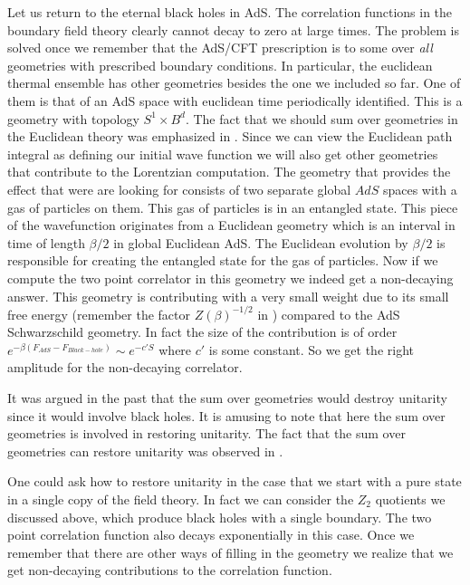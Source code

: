 Let us return to the   eternal black holes in AdS. 
The correlation functions in the boundary field theory clearly cannot decay 
to zero at large times. The problem is solved once we remember that
the AdS/CFT prescription is to some over {\it all}  geometries with 
prescribed boundary conditions. In particular, the euclidean 
thermal ensemble has other geometries besides the one we included so
far. One of them is that of an AdS space with euclidean time periodically
identified. This is a geometry with topology $S^1 \times B^{d}$. 
The fact that we should sum over geometries in the Euclidean theory
was emphasized in .
Since we can view the Euclidean path integral as defining our initial
wave function we will also get other geometries that contribute to 
the Lorentzian computation. The geometry that provides the effect that 
were are looking for  consists of two separate global $AdS$ spaces with
a gas of particles on them. This gas of particles is in an entangled
state. This piece of the wavefunction originates from a Euclidean geometry
which is an interval in time of length $\beta/2$ in global Euclidean AdS.
The Euclidean evolution by $\beta/2$   is responsible for creating
the entangled state for the gas of particles. 
Now if we compute the two point correlator in this geometry we indeed
get a non-decaying answer. This geometry is contributing with a 
very small weight due to its small free energy (remember the factor
$Z(\beta)^{-1/2} $
 in  \wavefunction ) compared to the AdS Schwarzschild geometry.
In fact the size of the contribution is of order 
$e^{ - \beta (F_{AdS} - F_{Black-hole} )} \sim e^{ - c' S} $ where 
$c'$ is some constant. So we get the right amplitude for the non-decaying
correlator. 

It was argued in the past that the sum over geometries would destroy
unitarity since it would involve black holes. It is amusing to note
that here  the sum over geometries  is involved in restoring 
unitarity. The fact that the sum over geometries  can restore unitarity
was observed  in .  



One could ask 
how to restore unitarity in the case that we start with a pure state in
a single copy of the field theory.
In fact we can consider the $Z_2$ quotients we discussed above, which 
produce black holes with a single boundary. The two point correlation
function also decays exponentially in this case. 
Once we remember that there are other ways of filling in the geometry
we realize that 
we get non-decaying contributions to the correlation function.



